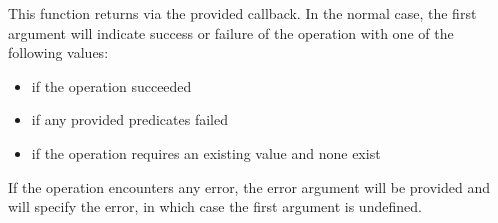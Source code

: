 This function returns via the provided callback.  In the normal case, the first
argument will indicate success or failure of the operation with one of the
following values:

\begin{itemize}[noitemsep]
\item {} if the operation succeeded
\item {} if any provided predicates failed
\item {} if the operation requires an existing value and none exist
\end{itemize}

If the operation encounters any error, the error argument will be provided and
will specify the error, in which case the first argument is undefined.
